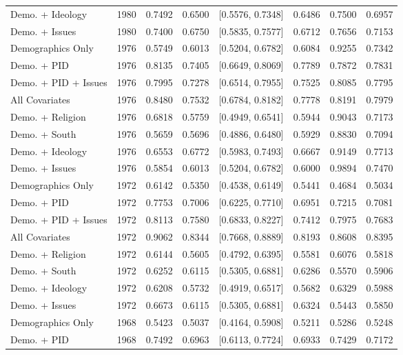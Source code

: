 \begin{longtable}{lrrrlrrr}
  Demo. + Ideology & 1980 & 0.7492 & 0.6500 & [0.5576, 0.7348] & 0.6486 & 0.7500 & 0.6957 \\ 
  Demo. + Issues & 1980 & 0.7400 & 0.6750 & [0.5835, 0.7577] & 0.6712 & 0.7656 & 0.7153 \\ 
  Demographics Only & 1976 & 0.5749 & 0.6013 & [0.5204, 0.6782] & 0.6084 & 0.9255 & 0.7342 \\ 
  Demo. + PID & 1976 & 0.8135 & 0.7405 & [0.6649, 0.8069] & 0.7789 & 0.7872 & 0.7831 \\ 
  Demo. + PID + Issues & 1976 & 0.7995 & 0.7278 & [0.6514, 0.7955] & 0.7525 & 0.8085 & 0.7795 \\ 
  All Covariates & 1976 & 0.8480 & 0.7532 & [0.6784, 0.8182] & 0.7778 & 0.8191 & 0.7979 \\ 
  Demo. + Religion & 1976 & 0.6818 & 0.5759 & [0.4949, 0.6541] & 0.5944 & 0.9043 & 0.7173 \\ 
  Demo. + South & 1976 & 0.5659 & 0.5696 & [0.4886, 0.6480] & 0.5929 & 0.8830 & 0.7094 \\ 
  Demo. + Ideology & 1976 & 0.6553 & 0.6772 & [0.5983, 0.7493] & 0.6667 & 0.9149 & 0.7713 \\ 
  Demo. + Issues & 1976 & 0.5854 & 0.6013 & [0.5204, 0.6782] & 0.6000 & 0.9894 & 0.7470 \\ 
  Demographics Only & 1972 & 0.6142 & 0.5350 & [0.4538, 0.6149] & 0.5441 & 0.4684 & 0.5034 \\ 
  Demo. + PID & 1972 & 0.7753 & 0.7006 & [0.6225, 0.7710] & 0.6951 & 0.7215 & 0.7081 \\ 
  Demo. + PID + Issues & 1972 & 0.8113 & 0.7580 & [0.6833, 0.8227] & 0.7412 & 0.7975 & 0.7683 \\ 
  All Covariates & 1972 & 0.9062 & 0.8344 & [0.7668, 0.8889] & 0.8193 & 0.8608 & 0.8395 \\ 
  Demo. + Religion & 1972 & 0.6144 & 0.5605 & [0.4792, 0.6395] & 0.5581 & 0.6076 & 0.5818 \\ 
  Demo. + South & 1972 & 0.6252 & 0.6115 & [0.5305, 0.6881] & 0.6286 & 0.5570 & 0.5906 \\ 
  Demo. + Ideology & 1972 & 0.6208 & 0.5732 & [0.4919, 0.6517] & 0.5682 & 0.6329 & 0.5988 \\ 
  Demo. + Issues & 1972 & 0.6673 & 0.6115 & [0.5305, 0.6881] & 0.6324 & 0.5443 & 0.5850 \\ 
  Demographics Only & 1968 & 0.5423 & 0.5037 & [0.4164, 0.5908] & 0.5211 & 0.5286 & 0.5248 \\ 
  Demo. + PID & 1968 & 0.7492 & 0.6963 & [0.6113, 0.7724] & 0.6933 & 0.7429 & 0.7172 \\ 

\end{longtable}
